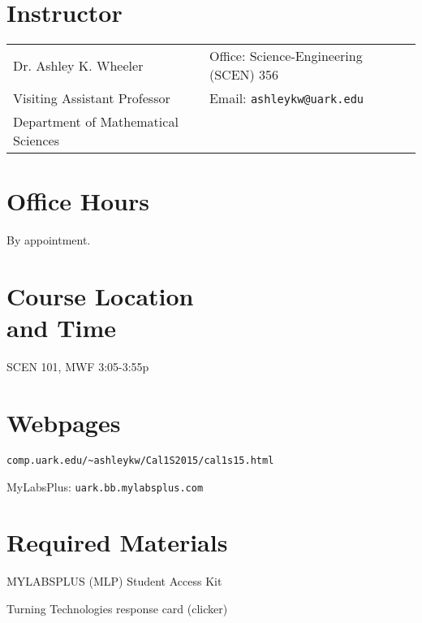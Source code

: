 \documentclass[margin,line,pifont,palatino,courier]{res}
\newenvironment{list1}{
  \begin{list}{\ding{113}}{%
      \setlength{\itemsep}{0in}
      \setlength{\parsep}{0in} \setlength{\parskip}{0in}
      \setlength{\topsep}{0in} \setlength{\partopsep}{0in}
      \setlength{\leftmargin}{0.17in}}}{\end{list}}
\begin{document}

\begin{resume}

\section{\sc Instructor}

\vspace{.05in}
\begin{tabular}{@{}p{2.6in}p{4in}}
Dr. Ashley K. Wheeler & Office: Science-Engineering (SCEN) 356 \\
Visiting Assistant Professor & Email: \verb+ashleykw@uark.edu+ \\
Department of Mathematical Sciences & 
\end{tabular}

\section{\sc Office Hours}
By appointment.

\section{\sc Course Location \\ and Time} SCEN 101, MWF 3:05-3:55p

\section{\sc Webpages}
\begin{list1}
\item \verb+comp.uark.edu/~ashleykw/Cal1S2015/cal1s15.html+ 
\item MyLabsPlus:  \verb+uark.bb.mylabsplus.com+ 
\end{list1}

\section{\sc Required Materials}
\begin{list1}
\item MYLABSPLUS (MLP) Student Access Kit 
\item Turning Technologies response card (clicker)
\end{list1}


\end{resume}
\end{document}

